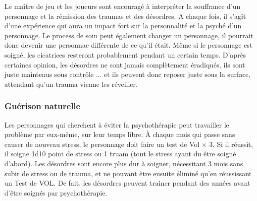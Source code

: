 Le maître de jeu et les joueurs sont encouragé à interpréter la souffrance d'un personnage et la rémission des traumas et des désordres. A chaque fois, il s'agît d'une expérience qui aura un impact fort sur la personnalité et la psyché d'un personnage. Le process de soin peut également changer un personnage, il pourrait donc devenir une personnae différente de ce qu'il était. Même si le personnage est soigné, les cicatrices resteront probablement pendant un certain temps. D'après certaines opinion, les désordres ne sont jamais complètement éradiqués, ils sont juste maintenus sous contrôle ... et ils peuvent donc reposer juste sous la surface, attendant qu'un trauma vienne les réveiller. 

\subsubsection{Guérison naturelle} 

Les personnages qui cherchent à éviter la psychothérapie peut travailler le problème par eux-même, sur leur temps libre. À chaque mois qui passe sans causer de nouveau stress, le personnage doit faire un test de Vol $\times$ 3. Si il réussit, il soigne 1d10 point de stress ou 1 truam (tout le stress ayant du être soigné d'abord). Les désordres sont encore plus dur à soigner, nécessitant 3 mois sans subir de stress ou de trauma, et ne pouvant être ensuite éliminé qu'en réussissant un Test de VOL. De fait, les désordres peuvent trainer pendant des années avant d'être soignés par psychothérapie. 



